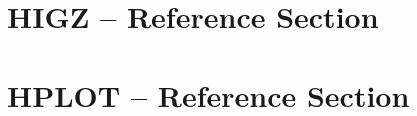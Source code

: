 \documentclass[11pt]{cernman}
\begin{document}


\setcounter{page}{1}
\part{HIGZ -- Reference Section}

\part{HPLOT -- Reference Section}


\begin{appendix}
\end{appendix}
 

\newpage
\end{document}
